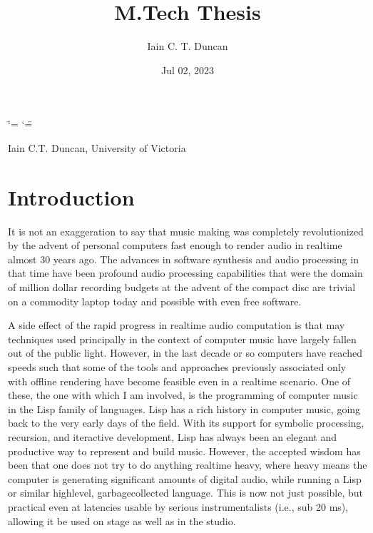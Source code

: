 \documentclass[letterpaper,10pt,english]{sphinxmanual}
\title{M.Tech Thesis}
\date{Jul 02, 2023}
\author{Iain C.\@{} T.\@{} Duncan}
\begin{document}
\ifdefined\shorthandoff
  \ifnum\catcode`\=\string=\active\shorthandoff{=}\fi
  \ifnum\catcode`\"=\active{}\fi
\fi

\pagestyle{empty}
\sphinxmaketitle
\pagestyle{plain}
\sphinxtableofcontents
\pagestyle{normal}
\label{\detokenize{index::doc}}


\sphinxAtStartPar
Iain C.T. Duncan, University of Victoria

\sphinxstepscope


\chapter{Introduction}
\label{\detokenize{introduction:introduction}}\label{\detokenize{introduction::doc}}
\sphinxAtStartPar
It is not an exaggeration to say that music making was
completely revolutionized by the advent of personal computers fast
enough to render audio in realtime almost 30 years ago. The advances
in software synthesis and audio processing in that time have been profound \sphinxhyphen{}
audio processing capabilities that were the domain of million dollar recording budgets
at the advent of the compact disc are trivial on a commodity laptop today and possible
with even free software.

\sphinxAtStartPar
A side effect of the rapid progress in realtime audio computation is that may techniques
used principally in the context of  computer music have largely fallen out of the public light.
However, in the last decade or so computers have reached speeds such that some of the
tools and approaches previously associated only with offline rendering have become
feasible even in a realtime scenario.
One of these, the one with which I am involved, is the programming of computer music in the
Lisp family of languages.
Lisp has a rich history in computer music, going back to the very early days of the field.
With its support for symbolic processing, recursion, and iteractive development,
Lisp has always been an elegant and productive way to represent and build music.
However, the accepted wisdom has been that one does not try to do anything
realtime heavy, where heavy means the computer is generating significant amounts of digital audio,
while running a Lisp or similar high\sphinxhyphen{}level, garbage\sphinxhyphen{}collected language.
This is now not just possible, but practical even at latencies usable by serious instrumentalists
(i.e., sub 20 ms), allowing it be used on stage as well as in the studio.
\end{document}
